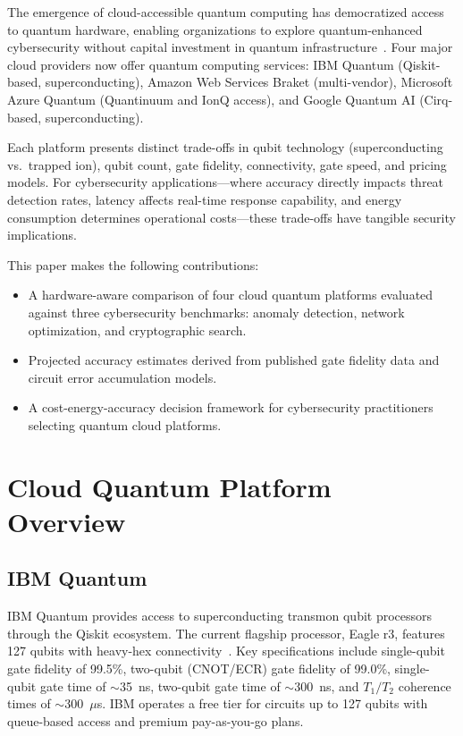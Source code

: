 \documentclass[conference]{IEEEtran}
\begin{document}
The emergence of cloud-accessible quantum computing has democratized access to quantum hardware, enabling organizations to explore quantum-enhanced cybersecurity without capital investment in quantum infrastructure~\cite{castelvecchi2017ibm}. Four major cloud providers now offer quantum computing services: IBM Quantum (Qiskit-based, superconducting), Amazon Web Services Braket (multi-vendor), Microsoft Azure Quantum (Quantinuum and IonQ access), and Google Quantum AI (Cirq-based, superconducting).

Each platform presents distinct trade-offs in qubit technology (superconducting vs.\ trapped ion), qubit count, gate fidelity, connectivity, gate speed, and pricing models. For cybersecurity applications---where accuracy directly impacts threat detection rates, latency affects real-time response capability, and energy consumption determines operational costs---these trade-offs have tangible security implications.

This paper makes the following contributions:

\begin{itemize}
    \item A hardware-aware comparison of four cloud quantum platforms evaluated against three cybersecurity benchmarks: anomaly detection, network optimization, and cryptographic search.
    \item Projected accuracy estimates derived from published gate fidelity data and circuit error accumulation models.
    \item A cost-energy-accuracy decision framework for cybersecurity practitioners selecting quantum cloud platforms.
\end{itemize}

\section{Cloud Quantum Platform Overview}

\subsection{IBM Quantum}

IBM Quantum provides access to superconducting transmon qubit processors through the Qiskit ecosystem. The current flagship processor, Eagle r3, features 127 qubits with heavy-hex connectivity~\cite{ibm2023eagle}. Key specifications include single-qubit gate fidelity of 99.5\%, two-qubit (CNOT/ECR) gate fidelity of 99.0\%, single-qubit gate time of $\sim$35~ns, two-qubit gate time of $\sim$300~ns, and $T_1/T_2$ coherence times of $\sim$300~$\mu$s. IBM operates a free tier for circuits up to 127 qubits with queue-based access and premium pay-as-you-go plans.
\end{document}
